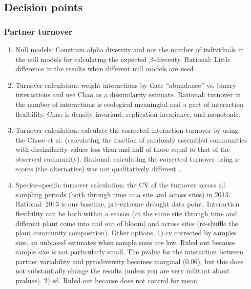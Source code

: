 \documentclass{article}\usepackage[]{graphicx}\usepackage[]{color}
\begin{document}
\subsection{Decision points}
  \label{sec:pop_resist_dp1}
\subsubsection{Partner turnover}
\begin{enumerate}
\item Null models: Constrain alpha diversity and not the number of
  individuals in the null models for calculating the expected
  $\beta$-diversity. Rational: Little difference in the results when
  different null models are used \citep{ponisio2015farm}
\item Turnover calculation: weight interactions by their ``abundance''
  vs. binary interactions and use Chao as a dissimilarity
  estimate. Rational: turnover in the number of interactions is
  ecological meaningful and a part of interaction flexibility. Chao
  \citep{Chao2005} is density invariant, replication invariance, and
  monotonic.
\item Turnover calculation: calculate the corrected interaction
  turnover by using the Chase et al. (calculating the fraction of
  randomly assembled communities with dissimilarity values less than
  and half of those equal to that of the observed
  community). Rational: calculating the corrected turnover using
  z-scores (the alternative) was not qualitatively different
  \citep{ponisio2015farm}.
\item Species-specific turnover calculation: the CV of the turnover
  across all sampling periods (both through time at a site and across
  sites) in 2013. Rational: 2013 is our baseline, pre-extreme drought
  data point. Interaction flexibility can be both within a season (at
  the same site through time and different plant come into and out of
  bloom) and across sites (re-shuffle the plant community
  composition). Other options, 1) cv corrected by samples size, an
  unbiased estimates when sample sizes are low. Ruled out because
  sample size is not particularly small. The pvalue
  for the interaction between partner variability and pyrodiversity
  becomes marginal (0.06), but this does not substantially change the
  results (unless you are very militant about pvalues). 2) sd. Ruled
  out because does not control for mean. 
\end{enumerate}
\end{document}
